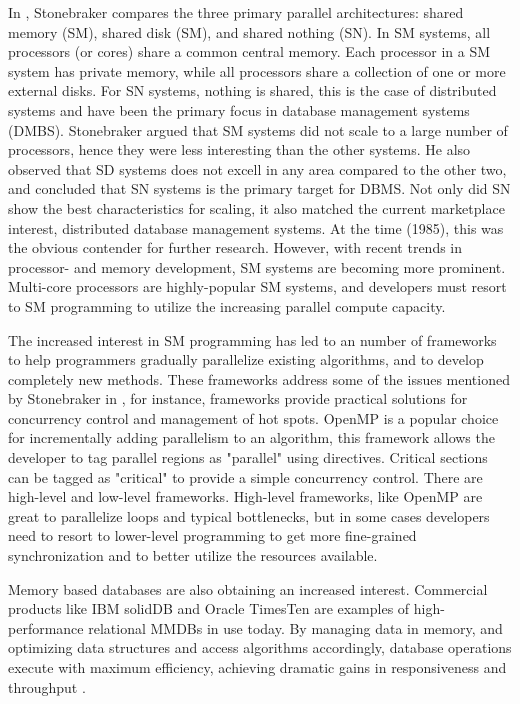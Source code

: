 In \cite{stonebraker:the}, Stonebraker compares the three primary
parallel architectures: shared memory (SM), shared disk (SM), and
shared nothing (SN). In SM systems, all processors (or cores) share a
common central memory. Each processor in a SM system has private
memory, while all processors share a collection of one or more
external disks. For SN systems, nothing is shared, this is the case of
distributed systems and have been the primary focus in database
management systems (DMBS). Stonebraker argued that SM systems did not
scale to a large number of processors, hence they were less
interesting than the other systems. He also observed that SD systems
does not excell in any area compared to the other two, and concluded
that SN systems is the primary target for DBMS. Not only did SN show
the best characteristics for scaling, it also matched the current
marketplace interest, distributed database management systems. At the
time (1985), this was the obvious contender for further research.
However, with recent trends in processor- and memory development, SM
systems are becoming more prominent. Multi-core processors are
highly-popular SM systems, and developers must resort to SM
programming to utilize the increasing parallel compute capacity.

The increased interest in SM programming has led to an number of
frameworks to help programmers gradually parallelize existing
algorithms, and to develop completely new methods. These frameworks
address some of the issues mentioned by Stonebraker in
\cite{stonebraker:the}, for instance, frameworks provide practical
solutions for concurrency control and management of hot spots. OpenMP
is a popular choice for incrementally adding parallelism to an
algorithm, this framework allows the developer to tag parallel regions
as "parallel" using directives. Critical sections can be tagged as
"critical" to provide a simple concurrency control. There are
high-level and low-level frameworks. High-level frameworks, like
OpenMP are great to parallelize loops and typical bottlenecks, but in
some cases developers need to resort to lower-level programming to get
more fine-grained synchronization and to better utilize the resources
available.

Memory based databases are also obtaining an increased interest.
Commercial products like IBM solidDB and Oracle TimesTen are examples
of high-performance relational MMDBs in use today. By managing data in
memory, and optimizing data structures and access algorithms
accordingly, database operations execute with maximum efficiency,
achieving dramatic gains in responsiveness and throughput
\cite{oracle}.

